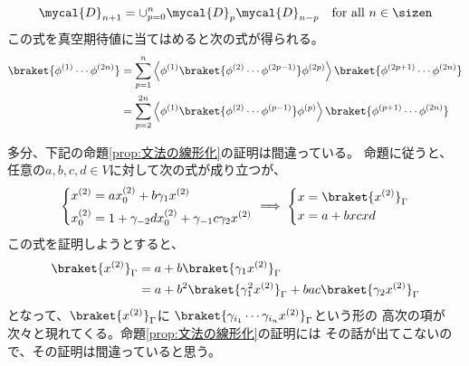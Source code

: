 {\begin{todo}[Wickの定理]
\begin{equation*}
\begin{split}
			\mycal{D}_{n+1} = \cup_{p=0}^n \mycal{D}_p\mycal{D}_{n-p}
			\quad\text{for all } n\in\sizen
		\end{split}\end{equation*}
		この式を真空期待値に当てはめると次の式が得られる。
		\begin{equation*}\begin{split}
			\braket{\phi^{(1)}\cdots\phi^{(2n)}}
			&= \sum_{p=1}^n \left\langle\phi^{(1)}
				\braket{\phi^{(2)}\cdots\phi^{(2p-1)}}\phi^{(2p)}\right\rangle
				\braket{\phi^{(2p+1)}\cdots\phi^{(2n)}} \\
			&= \sum_{p=2}^{2n} \left\langle\phi^{(1)}
				\braket{\phi^{(2)}\cdots\phi^{(p-1)}}\phi^{(p)}\right\rangle
				\braket{\phi^{(p+1)}\cdots\phi^{(2n)}} \\
		\end{split}\end{equation*}
	\end{todo} %

	\begin{todo}[ここまで]\label{todo:ここまで} %
		多分、下記の命題\ref{prop:文法の線形化}の証明は間違っている。
		命題に従うと、任意の$a,b,c,d\in V$に対して次の式が成り立つが、
		\begin{equation}\label{eq:二次式の線形化}\begin{split}
			\left\{\begin{split}
				x^{(2)} &= ax_0^{(2)} + b\gamma_1x^{(2)} \\
				x_0^{(2)} &= 1 + \gamma_{-2}dx_0^{(2)} 
				+ \gamma_{-1}c\gamma_2x^{(2)}
			\end{split}\right. \implies \left\{\begin{split}
				x &= \braket{x^{(2)}}_\Gamma \\
				x &= a + bxcxd
			\end{split}\right.
		\end{split}\end{equation}
		この式を証明しようとすると、
		\begin{equation*}\begin{split}
			\braket{x^{(2)}}_\Gamma &= a + b\braket{\gamma_1x^{(2)}}_\Gamma \\
			&= a + b^2\braket{\gamma_1^2x^{(2)}}_\Gamma
				+ bac\braket{\gamma_2x^{(2)}}_\Gamma \\
		\end{split}\end{equation*}
		となって、$\braket{x^{(2)}}_\Gamma$に
		$\braket{\gamma_{i_1}\cdots\gamma_{i_n}x^{(2)}}_\Gamma$という形の
		高次の項が次々と現れてくる。命題\ref{prop:文法の線形化}の証明には
		その話が出てこないので、その証明は間違っていると思う。


\end{todo}}
